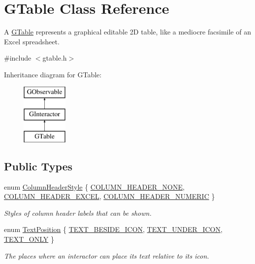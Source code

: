 \hypertarget{classsgl_1_1GTable}{}\section{G\+Table Class Reference}
\label{classsgl_1_1GTable}


A \mbox{\hyperlink{classsgl_1_1GTable}{G\+Table}} represents a graphical editable 2D table, like a mediocre facsimile of an Excel spreadsheet.  




{\ttfamily \#include $<$gtable.\+h$>$}

Inheritance diagram for G\+Table\+:\begin{figure}[H]
\begin{center}
\leavevmode
\includegraphics[height=3.000000cm]{classsgl_1_1GTable}
\end{center}
\end{figure}
\subsection*{Public Types}
\begin{DoxyCompactItemize}
\item 
enum \mbox{\hyperlink{classsgl_1_1GTable_a060cff504451bbb98530e64e936e2671}{Column\+Header\+Style}} \{ \mbox{\hyperlink{classsgl_1_1GTable_a060cff504451bbb98530e64e936e2671a64e90531468e72442ee778fe31accdf6}{C\+O\+L\+U\+M\+N\+\_\+\+H\+E\+A\+D\+E\+R\+\_\+\+N\+O\+NE}}, 
\mbox{\hyperlink{classsgl_1_1GTable_a060cff504451bbb98530e64e936e2671aa4b2febb21afe5d988ac57d4bac55a8b}{C\+O\+L\+U\+M\+N\+\_\+\+H\+E\+A\+D\+E\+R\+\_\+\+E\+X\+C\+EL}}, 
\mbox{\hyperlink{classsgl_1_1GTable_a060cff504451bbb98530e64e936e2671ab59182f94a821e007f1ede2dd29b23cd}{C\+O\+L\+U\+M\+N\+\_\+\+H\+E\+A\+D\+E\+R\+\_\+\+N\+U\+M\+E\+R\+IC}}
 \}
\begin{DoxyCompactList}\small\item\em Styles of column header labels that can be shown. \end{DoxyCompactList}\item 
enum \mbox{\hyperlink{classsgl_1_1GInteractor_a8e0d441725a81d2bbdebbea09078260e}{Text\+Position}} \{ \mbox{\hyperlink{classsgl_1_1GInteractor_a8e0d441725a81d2bbdebbea09078260ea4cd6f2e7d5a08d6f4dc052df2358f774}{T\+E\+X\+T\+\_\+\+B\+E\+S\+I\+D\+E\+\_\+\+I\+C\+ON}}, 
\mbox{\hyperlink{classsgl_1_1GInteractor_a8e0d441725a81d2bbdebbea09078260eaa88490f63d8de68d44c83bdb2ecde3b3}{T\+E\+X\+T\+\_\+\+U\+N\+D\+E\+R\+\_\+\+I\+C\+ON}}, 
\mbox{\hyperlink{classsgl_1_1GInteractor_a8e0d441725a81d2bbdebbea09078260ea39a6f388a30ac4fefb6eb13e846bc9f2}{T\+E\+X\+T\+\_\+\+O\+N\+LY}}
 \}
\begin{DoxyCompactList}\small\item\em The places where an interactor can place its text relative to its icon. \end{DoxyCompactList}\end{DoxyCompactItemize}
